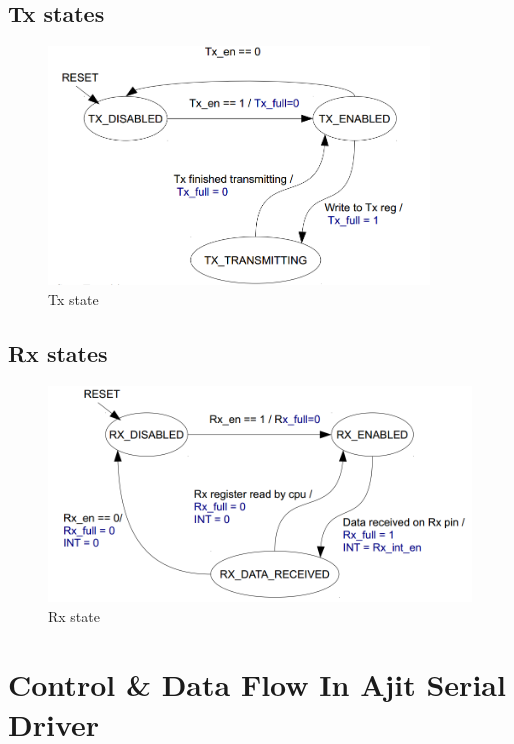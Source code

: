 \documentclass[12pt,a4paper]{article}
\begin{document}
\subsection{Tx states}
	\begin{figure}[h!]
	\centering
	\includegraphics[width=0.9\textwidth]{./figs/tx_state.png}
	\caption{Tx state}
	\label{fig3}
	\end{figure}	
\newpage
\subsection{Rx states}
	\begin{figure}[h!]
	\centering
	\includegraphics[width=1.0\textwidth]{./figs/rx_state.png}
	\caption{Rx state}
	\label{fig4}
	\end{figure}	
\newpage
\section{Control \& Data Flow In Ajit Serial Driver}
\end{document}
